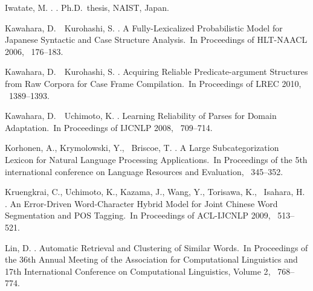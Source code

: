 \documentclass[english]{jnlp_1.4}
\begin{document}
\begin{thebibliography}{}
Iwatate, M. \BBCP.
.
\newblock Ph.D.\ thesis, NAIST, Japan.

\mbox{Kawahara}, D.\BBACOMMA\ \BBA\ Kurohashi, S. \BBCP.
\newblock \BBOQ A Fully-Lexicalized Probabilistic Model for Japanese Syntactic
  and Case Structure Analysis.\BBCQ\
\newblock In {\Bem Proceedings of HLT-NAACL 2006}, \mbox{\BPGS\ 176--183}.

Kawahara, D.\BBACOMMA\ \BBA\ \mbox{Kurohashi}, S. \BBCP.
\newblock \BBOQ Acquiring Reliable Predicate-argument Structures from Raw
  Corpora for Case Frame Compilation.\BBCQ\
\newblock In {\Bem Proceedings of LREC 2010}, \mbox{\BPGS\ 1389--1393}.

Kawahara, D.\BBACOMMA\ \BBA\ Uchimoto, K. \BBCP.
\newblock \BBOQ Learning Reliability of Parses for Domain Adaptation.\BBCQ\
\newblock In {\Bem Proceedings of IJCNLP 2008}, \mbox{\BPGS\ 709--714}.

\mbox{Korhonen}, A., Krymolowski, Y., \BBA\ Briscoe, T. \BBCP.
\newblock \BBOQ A Large Subcategorization Lexicon for Natural Language
  Processing Applications.\BBCQ\
\newblock In {\Bem Proceedings of the 5th international conference on Language
  Resources and Evaluation}, \mbox{\BPGS\ 345--352}.

Kruengkrai, C., Uchimoto, K., Kazama, J., Wang, Y., Torisawa, K., \BBA\
  Isahara, H. \BBCP.
\newblock \BBOQ An Error-Driven Word-Character Hybrid Model for Joint Chinese
  Word Segmentation and POS Tagging.\BBCQ\
\newblock In {\Bem Proceedings of ACL-IJCNLP 2009}, \mbox{\BPGS\ 513--521}.

\bibitem[\protect\BCAY{Lin}{Lin}{1998}]{Lin:1998:ACLCOLING}
Lin, D. \BBOP 1998\BBCP.
\newblock \BBOQ Automatic Retrieval and Clustering of Similar Words.\BBCQ\
\newblock In {\Bem Proceedings of the 36th Annual Meeting of the Association
  for Computational Linguistics and 17th International Conference on
  Computational Linguistics, Volume 2}, \mbox{\BPGS\ 768--774}.


\end{thebibliography}
\end{document}
